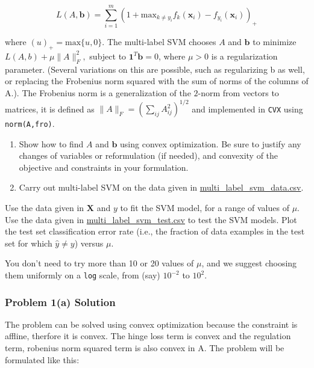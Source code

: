 \documentclass[
  letterpaper,
  DIV=11,
  numbers=noendperiod]{scrartcl}
\begin{document}
\[
L(A, \mathbf{b}) = \sum_{i=1}^m\left(1 + \mathrm{max}_{k \neq y_i}f_k(\mathbf{x}_i) - f_{y_i}(\mathbf{x}_i)  \right)_+
\]

where \((u)_+ = \mathrm{max}\{u, 0\}\). The multi-label SVM chooses
\(A\) and \(\mathbf{b}\) to minimize \(L(A, b) + \mu\|A\|_F^2,\) subject
to \(\mathbf{1}^T \mathbf{b} = 0\), where \(\mu > 0\) is a
regularization parameter. (Several variations on this are possible, such
as regularizing b as well, or replacing the Frobenius norm squared with
the sum of norms of the columns of A.). The Frobenius norm is a
generalization of the \(2\)-norm from vectors to matrices, it is defined
as \(\|A\|_F = \left(\sum_{ij} A_{ij}^2\right)^{1/2}\) and implemented
in \texttt{CVX} using
\texttt{norm(A,\textquotesingle{}fro\textquotesingle{})}.

\begin{enumerate}
\def\labelenumi{(\alph{enumi})}
\item
  Show how to find \(A\) and \(\mathbf{b}\) using convex optimization.
  Be sure to justify any changes of variables or reformulation (if
  needed), and convexity of the objective and constraints in your
  formulation.
\item
  Carry out multi-label SVM on the data given in
  \href{https://github.com/georgehagstrom/DATA609Spring2025/blob/main/website/assignments/labs/labData/multi_label_svm_data.csv}{multi\_label\_svm\_data.csv}.
\end{enumerate}

Use the data given in \(\mathbf{X}\) and \(y\) to fit the SVM model, for
a range of values of \(\mu\). Use the data given in
\href{https://github.com/georgehagstrom/DATA609Spring2025/blob/main/website/assignments/labs/labData/multi_label_svm_test.csv}{multi\_label\_svm\_test.csv}
to test the SVM models. Plot the test set classification error rate
(i.e., the fraction of data examples in the test set for which
\(\hat{y} \neq y\)) versus \(\mu\).

You don't need to try more than 10 or 20 values of \(\mu\), and we
suggest choosing them uniformly on a \texttt{log} scale, from (say)
\(10^{−2}\) to \(10^2\).

\subsubsection{Problem 1(a) Solution}\label{problem-1a-solution}

The problem can be solved using convex optimization because the
constraint is affline, therfore it is convex. The hinge loss term is
convex and the regulation term, robenius norm squared term is also
convex in A. The problem will be formulated like this:
\end{document}
